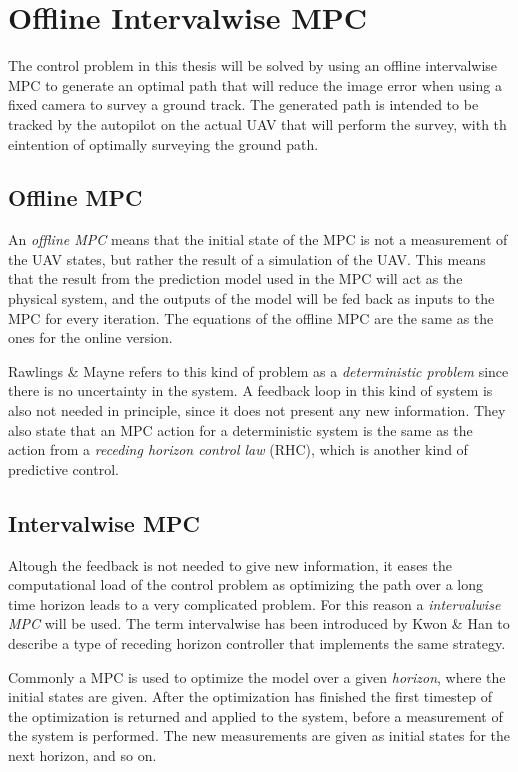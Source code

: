 \section{Offline Intervalwise MPC}

The control problem in this thesis will be solved by using an offline intervalwise MPC to generate an optimal path that will reduce the image error when using a fixed camera to survey a ground track. The generated path is intended to be tracked by the autopilot on the actual UAV that will perform the survey, with th eintention of optimally surveying the ground path.

\subsection{Offline MPC} 

An \textit{offline MPC} means that the initial state of the MPC is not a measurement of the UAV states, but rather the result of a simulation of the UAV. This means that the result from the prediction model used in the MPC will act as the physical system, and the outputs of the model will be fed back as inputs to the MPC for every iteration. The equations of the offline MPC are the same as the ones for the online version.

Rawlings \& Mayne \cite{mpcMAYNE} refers to this kind of problem as a \textit{deterministic problem} since there is no uncertainty in the system. A feedback loop in this kind of system is also not needed in principle, since it does not present any new information. They also state that an MPC action for a deterministic system is the same as the action from a \textit{receding horizon control law} (RHC), which is another kind of predictive control.

\subsection{Intervalwise MPC}

Altough the feedback is not needed to give new information, it eases the computational load of the control problem as optimizing the path over a long time horizon leads to a very complicated problem. For this reason a \textit{intervalwise MPC} will be used. The term intervalwise has been introduced by Kwon \& Han \cite{rhcKWON} to describe a type of receding horizon controller that implements the same strategy.

Commonly a MPC is used to optimize the model over a given \textit{horizon}, where the initial states are given. After the optimization has finished the first timestep of the optimization is returned and applied to the system, before a measurement of the system is performed. The new measurements are given as initial states for the next horizon, and so on.

